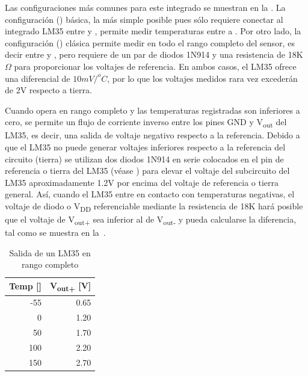 Las configuraciones más comunes para este integrado se muestran en la . La configuración () básica, la más simple posible pues sólo requiere conectar al integrado LM35 entre \VCC y \GND, permite medir temperaturas entre  a .
Por otro lado, la configuración () clásica permite medir en todo el rango completo del sensor, es decir entre  y , pero requiere de un par de diodos 1N914 y una resistencia de 18K$\Omega$ para proporcionar los voltajes de referencia.
En ambos casos, el LM35 ofrece una diferencial de $10mV/^{o}C$, por lo que los voltajes medidos rara vez excederán de 2V respecto a tierra.

Cuando opera en rango completo y las temperaturas registradas son inferiores a cero, se permite un flujo de corriente inverso entre los pines GND y V\textsubscript{out} del LM35, es decir, una salida de voltaje negativo respecto a la referencia.
Debido a que el LM35 no puede generar voltajes inferiores respecto a la referencia del circuito (tierra) se utilizan dos diodos 1N914 en serie colocados en el pin de referencia o tierra del LM35 (véase ) para elevar el voltaje del subcircuito del LM35 aproximadamente 1.2V por encima del voltaje de referencia o tierra general.
Así, cuando el LM35 entre en contacto con temperaturas negativas, el voltaje de diodo o V\textsubscript{DD} referenciable mediante la resistencia de 18K hará posible que el voltaje de V\textsubscript{out+} sea inferior al de V\textsubscript{out-} y pueda calcularse la diferencia, tal como se muestra en la~.

\begin{table}
	\centering
	\caption{Salida de un LM35 en rango completo}%
	\label{tab:lm35} %
	\begin{tabular}{rr}%
	\toprule
	Temp [\degreesC{}]& V\textsubscript{out+} [V] \\
	\midrule
	-55 & 0.65 \\
	  0 & 1.20 \\
	 50 & 1.70 \\
	100 & 2.20 \\
	150 & 2.70 \\
	\bottomrule
	\end{tabular}
\end{table}